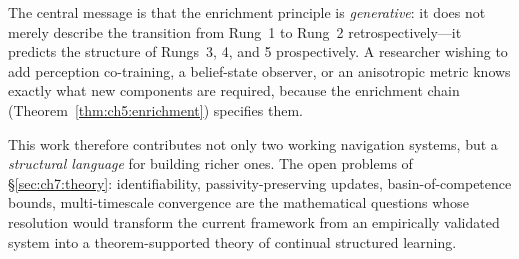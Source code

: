 The central message is that the enrichment principle is
\emph{generative}: it does not merely describe the transition from
Rung~1 to Rung~2 retrospectively—it predicts the structure of
Rungs~3, 4, and 5 prospectively.
A researcher wishing to add perception co-training, a belief-state
observer, or an anisotropic metric knows exactly what new components
are required, because the enrichment chain (Theorem~\ref{thm:ch5:enrichment})
specifies them.

This work therefore contributes not only two working navigation
systems, but a \emph{structural language} for building richer ones.
The open problems of §\ref{sec:ch7:theory}: identifiability,
passivity-preserving updates, basin-of-competence bounds,
multi-timescale convergence are the mathematical questions whose
resolution would transform the current framework from an empirically
validated system into a theorem-supported theory of continual
structured learning.

